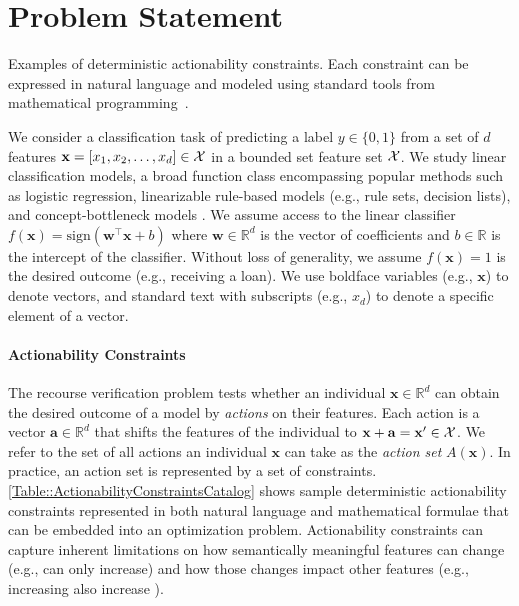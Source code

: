 \section{Problem Statement}
\begin{table*}[t]
    \centering
    \resizebox{\linewidth}{!}{
    
    }
    \caption{Examples of deterministic actionability constraints. Each constraint can be expressed in natural language and modeled using standard tools from mathematical programming~\citep[see e.g.,][]{wolsey2020integer}.} \label{Table::ActionabilityConstraintsCatalog}
    \vspace{-1em}
\end{table*}


We consider a classification task of predicting a label $y \in \{0,1\}$ from a set of $d$ features $\mathbf{x} = [x_1, x_2, \dots, x_d ] \in {\cal X}$ in a bounded set feature set ${\cal X}$. We study linear classification models, a broad function class encompassing popular methods such as logistic regression, linearizable rule-based models (e.g., rule sets, decision lists), and concept-bottleneck models \cite{koh2020concept, sun2024concept}. We assume access to the linear classifier $f(\mathbf{x}) = \text{sign}(\mathbf{w}^\top\mathbf{x} + b)$ where $\mathbf{w} \in \mathbb{R}^d$ is the vector of coefficients and $b \in \mathbb{R}$ is the intercept of the classifier. Without loss of generality, we assume $f(\mathbf{x}) = 1$ is the desired outcome (e.g., receiving a loan). We use boldface variables (e.g., $\mathbf{x}$) to denote vectors, and standard text with subscripts (e.g., $x_d$) to denote a specific element of a vector. 

\paragraph{Actionability Constraints}
The recourse verification problem \citep{kothari2023prediction} tests whether an individual $\mathbf{x} \in \mathbb{R}^d$ can obtain the desired outcome of a model by \emph{actions} on their features. Each action is a vector $\mathbf{a} \in \mathbb{R}^{d}$ that shifts the features of the individual to $\mathbf{x} + \mathbf{a} = \mathbf{x}' \in {\cal X}$. We refer to the set of all actions an individual $\mathbf{x}$ can take as the \emph{action set} $A(\mathbf{x})$. In practice, an action set is represented by a set of constraints. \cref{Table::ActionabilityConstraintsCatalog} %
%
shows sample deterministic actionability constraints represented in both natural language and mathematical formulae that can be embedded into an optimization problem. Actionability constraints can capture inherent limitations on how semantically meaningful features can change (e.g.,  can only increase) and how those changes impact other features (e.g., increasing  also increase ).


